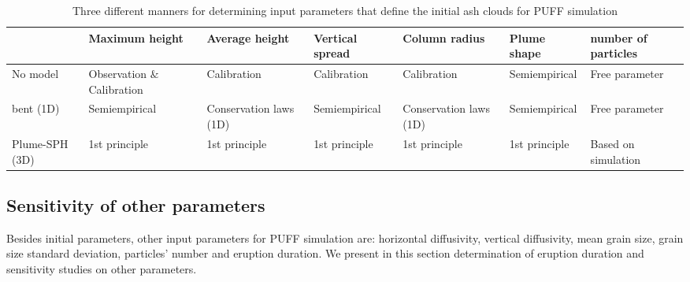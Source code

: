 \begin{table}[htp]
\centering
      \caption{Three different manners for determining input parameters that define the initial ash clouds for PUFF simulation}		
	  \begin{tabular}{p{19mm}p{23mm}p{20mm}p{20mm}p{20mm}p{20mm}p{18mm}}
	    \hline
	          & Maximum \newline height & Average \newline height & Vertical \newline spread & Column \newline radius & Plume \newline shape & number \newline of particles\\
	    \hline
	    No model & Observation $\&$ \newline Calibration & Calibration & Calibration & Calibration & Semiempirical & Free \newline parameter \\
	    bent (1D) & Semiempirical & Conservation \newline laws (1D) & Semiempirical & Conservation \newline laws (1D) & Semiempirical & Free \newline parameter\\
	    Plume-SPH \newline (3D) & 1st principle & 1st principle & 1st principle & 1st principle & 1st principle & Based on \newline simulation \\
	    \hline
	  \end{tabular}
	  \label{tab:VATDs-source-term-determination}
\end{table}

\subsection{Sensitivity of other parameters}

Besides initial parameters, other input parameters for PUFF simulation are: horizontal diffusivity, vertical diffusivity, mean grain size, grain size standard deviation, particles' number and eruption duration. We present in this section determination of eruption duration and sensitivity studies on other parameters.

